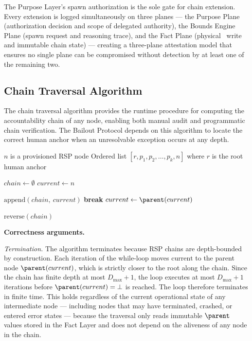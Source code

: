 The Purpose Layer's spawn authorization is the sole gate for chain extension. Every extension is logged simultaneously on three planes --- the Purpose Plane (authorization decision and scope of delegated authority), the Bounds Engine Plane (spawn request and reasoning trace), and the Fact Plane (physical \ParentPointer\ write and immutable chain state) --- creating a three-plane attestation model that ensures no single plane can be compromised without detection by at least one of the remaining two.

\subsection{Chain Traversal Algorithm}

The chain traversal algorithm provides the runtime procedure for computing the accountability chain of any node, enabling both manual audit and programmatic chain verification. The Bailout Protocol depends on this algorithm to locate the correct human anchor when an unresolvable exception occurs at any depth.

\begin{algorithm}
\caption{Chain-Traverse($n$) --- Compute the accountability chain from node $n$ to the human anchor}
\label{alg:chain-traverse}
\begin{algorithmic}[1]
\REQUIRE $n$ is a provisioned RSP node
\ENSURE Ordered list $[r, p_1, p_2, \ldots, p_k, n]$ where $r$ is the root human anchor

\STATE $chain \leftarrow \emptyset$ 
\STATE $current \leftarrow n$ 

    \STATE $\text{append}(chain,\ current)$ 
        \STATE \textbf{break} 
    \ENDIF
    \STATE $current \leftarrow \parent(current)$ 
\ENDWHILE

\RETURN $\text{reverse}(chain)$ 
\end{algorithmic}
\end{algorithm}

\bigskip
\noindent\textbf{Correctness arguments.}

\textit{Termination.} The algorithm terminates because RSP chains are depth-bounded by construction. Each iteration of the while-loop moves $\text{current}$ to the parent node $\parent(current)$, which is strictly closer to the root along the chain. Since the chain has finite depth at most $D_{\max} + 1$, the loop executes at most $D_{\max} + 1$ iterations before $\parent(current) = \bot$ is reached. The loop therefore terminates in finite time. This holds regardless of the current operational state of any intermediate node --- including nodes that may have terminated, crashed, or entered error states --- because the traversal only reads immutable $\parent$ values stored in the Fact Layer and does not depend on the aliveness of any node in the chain.

